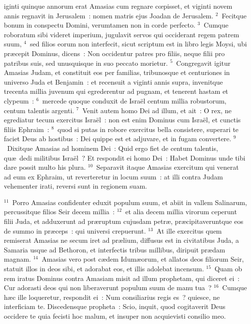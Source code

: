 \bchapter
{}iginti quinque annorum erat Amasias cum regnare cœpisset, et viginti novem annis regnavit in Jerusalem~: nomen matris ejus Joadan de Jerusalem.
${}^{2}$~Fecitque bonum in conspectu Domini, verumtamen non in corde perfecto.
${}^{3}$~Cumque roboratum sibi videret imperium, jugulavit servos qui occiderant regem patrem suum,
${}^{4}$~sed filios eorum non interfecit, sicut scriptum est in libro legis Moysi, ubi pr\ae cepit Dominus, dicens~: Non occidentur patres pro filiis, neque filii pro patribus suis, sed unusquisque in suo peccato morietur.
${}^{5}$~Congregavit igitur Amasias Judam, et constituit eos per familias, tribunosque et centuriones in universo Juda et Benjamin~: et recensuit a viginti annis supra, invenitque trecenta millia juvenum qui egrederentur ad pugnam, et tenerent hastam et clypeum~:
${}^{6}$~mercede quoque conduxit de Isra\"el centum millia robustorum, centum talentis argenti.
${}^{7}$~Venit autem homo Dei ad illum, et ait~: O rex, ne egrediatur tecum exercitus Isra\"el~: non est enim Dominus cum Isra\"el, et cunctis filiis Ephraim~:
${}^{8}$~quod si putas in robore exercitus bella consistere, superari te faciet Deus ab hostibus~: Dei quippe est et adjuvare, et in fugam convertere.
${}^{9}$~Dixitque Amasias ad hominem Dei~: Quid ergo fiet de centum talentis, qu\ae\ dedi militibus Isra\"el~? Et respondit ei homo Dei~: Habet Dominus unde tibi dare possit multo his plura.
${}^{10}$~Separavit itaque Amasias exercitum qui venerat ad eum ex Ephraim, ut reverteretur in locum suum~: at illi contra Judam vehementer irati, reversi sunt in regionem suam.


${}^{11}$~Porro Amasias confidenter eduxit populum suum, et abiit in vallem Salinarum, percussitque filios Seir decem millia~:
${}^{12}$~et alia decem millia virorum ceperunt filii Juda, et adduxerunt ad pr\ae ruptum cujusdam petr\ae , pr\ae cipitaveruntque eos de summo in pr\ae ceps~: qui universi crepuerunt.
${}^{13}$~At ille exercitus quem remiserat Amasias ne secum iret ad pr\ae lium, diffusus est in civitatibus Juda, a Samaria usque ad Bethoron, et interfectis tribus millibus, diripuit pr\ae dam magnam.
${}^{14}$~Amasias vero post c\ae dem Idum\ae orum, et allatos deos filiorum Seir, statuit illos in deos sibi, et adorabat eos, et illis adolebat incensum.
${}^{15}$~Quam ob rem iratus Dominus contra Amasiam misit ad illum prophetam, qui diceret ei~: Cur adorasti deos qui non liberaverunt populum suum de manu tua~?
${}^{16}$~Cumque h\ae c ille loqueretur, respondit ei~: Num consiliarius regis es~? quiesce, ne interficiam te. Discedensque propheta~: Scio, inquit, quod cogitaverit Deus occidere te quia fecisti hoc malum, et insuper non acquievisti consilio meo.



